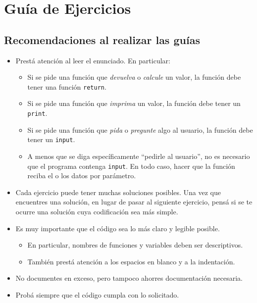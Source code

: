 \documentclass[
  letterpaper,
  DIV=11,
  numbers=noendperiod]{scrreprt}
\providecommand{\tightlist}{%
  \setlength{\itemsep}{0pt}\setlength{\parskip}{0pt}}\usepackage{longtable,booktabs,array}
\newlength{\cslhangindent}
\newenvironment{CSLReferences}[2] %
 {\begin{list}{}{%
  \setlength{\itemindent}{0pt}
  \setlength{\leftmargin}{0pt}
  \setlength{\parsep}{0pt}
  \ifodd #1
   \setlength{\leftmargin}{\cslhangindent}
   \setlength{\itemindent}{-1\cslhangindent}
  \fi
  \setlength{\itemsep}{#2\baselineskip}}}
 {\end{list}}
\begin{document}
\label{refs}
\begin{CSLReferences}{0}{1}
\end{CSLReferences}


\chapter*{Guía de Ejercicios}\label{guuxeda-de-ejercicios}


\section*{Recomendaciones al realizar las
guías}\label{recomendaciones-al-realizar-las-guuxedas}


\begin{itemize}
\tightlist
\item
  Prestá atención al leer el enunciado. En particular:

  \begin{itemize}
  \tightlist
  \item
    Si se pide una función que \emph{devuelva} o \emph{calcule} un
    valor, la función debe tener una función \texttt{return}.
  \item
    Si se pide una función que \emph{imprima} un valor, la función debe
    tener un \texttt{print}.
  \item
    Si se pide una función que \emph{pida} o \emph{pregunte} algo al
    usuario, la función debe tener un \texttt{input}.
  \item
    A menos que se diga específicamente ``pedirle al usuario'', no es
    necesario que el programa contenga \texttt{input}. En todo caso,
    hacer que la función reciba el o los datos por parámetro.
  \end{itemize}
\item
  Cada ejercicio puede tener muchas soluciones posibles. Una vez que
  encuentres una solución, en lugar de pasar al siguiente ejercicio,
  pensá si se te ocurre una solución cuya codificación sea más simple.
\item
  Es muy importante que el código sea lo más claro y legible posible.

  \begin{itemize}
  \tightlist
  \item
    En particular, nombres de funciones y variables deben ser
    descriptivos.
  \item
    También prestá atención a los espacios en blanco y a la indentación.
  \end{itemize}
\item
  No documentes en exceso, pero tampoco ahorres documentación necesaria.
\item
  Probá siempre que el código cumpla con lo solicitado.
\end{itemize}
\end{document}
